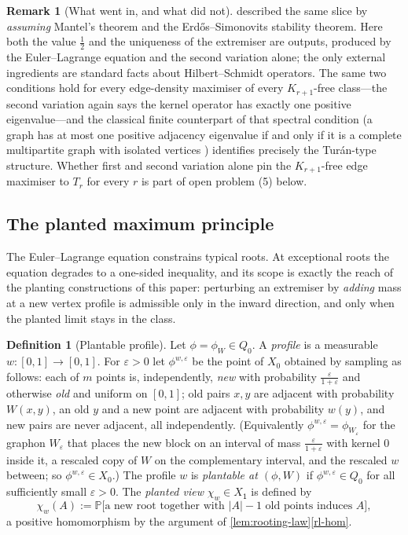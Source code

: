 \documentclass[11pt]{article}
\theoremstyle{definition}
\newtheorem{definition}[definition]{Definition}
\newtheorem{remark}[remark]{Remark}
\newcommand{\Prob}{\mathbb{P}}
\newcommand{\eps}{\varepsilon}
\newcommand{\vtype}{\mathsf{1}}
\begin{document}
\begin{remark}[What went in, and what did not]\label{rem:mantel-comparison}
 described the same slice by \emph{assuming} Mantel's theorem
and the Erd\H{o}s--Simonovits stability theorem.  Here both the value $\frac12$ and the
uniqueness of the extremiser are outputs, produced by the Euler--Lagrange equation and
the second variation alone; the only external ingredients are standard facts about
Hilbert--Schmidt operators.  The same two conditions hold for every edge-density
maximiser of every $K_{r+1}$-free class---the second variation again says the kernel
operator has exactly one positive eigenvalue---and the classical finite counterpart of
that spectral condition (a graph has at most one positive adjacency eigenvalue if and
only if it is a complete multipartite graph with isolated vertices \cite{Smith1970})
identifies precisely the Tur\'an-type structure.  Whether first and second variation
alone pin the $K_{r+1}$-free edge maximiser to $T_r$ for every $r$ is part of open
problem (5) below.
\end{remark}

\subsection{The planted maximum principle}

The Euler--Lagrange equation constrains typical roots.  At exceptional roots the
equation degrades to a one-sided inequality, and its scope is exactly the reach of the
planting constructions of this paper: perturbing an extremiser by \emph{adding} mass at
a new vertex profile is admissible only in the inward direction, and only when the
planted limit stays in the class.

\begin{definition}[Plantable profile]\label{def:plantable-profile}
Let $\phi=\phi_W\in Q_0$.  A \emph{profile} is a measurable $w\colon[0,1]\to[0,1]$.
For $\eps>0$ let $\phi^{w,\eps}$ be the point of $X_0$ obtained by sampling as
follows: each of $m$ points is, independently, \emph{new} with probability
$\frac{\eps}{1+\eps}$ and otherwise \emph{old} and uniform on $[0,1]$; old pairs
$x,y$ are adjacent with probability $W(x,y)$, an old $y$ and a new point are adjacent
with probability $w(y)$, and new pairs are never adjacent, all independently.
(Equivalently $\phi^{w,\eps}=\phi_{W_\eps}$ for the graphon $W_\eps$ that places the
new block on an interval of mass $\frac{\eps}{1+\eps}$ with kernel $0$ inside it, a
rescaled copy of $W$ on the complementary interval, and the rescaled $w$ between; so
$\phi^{w,\eps}\in X_0$.)  The profile
$w$ is \emph{plantable at $(\phi,W)$} if $\phi^{w,\eps}\in Q_0$ for all sufficiently
small $\eps>0$.  The \emph{planted view} $\chi_w\in X_{\vtype}$ is defined by
\[
  \chi_w(A):=\Prob\bigl[\text{a new root together with $|A|-1$ old points induces
  }A\bigr],
\]
a positive homomorphism by the argument of \cref{lem:rooting-law}\ref{rl-hom}.
\end{definition}
\end{document}
